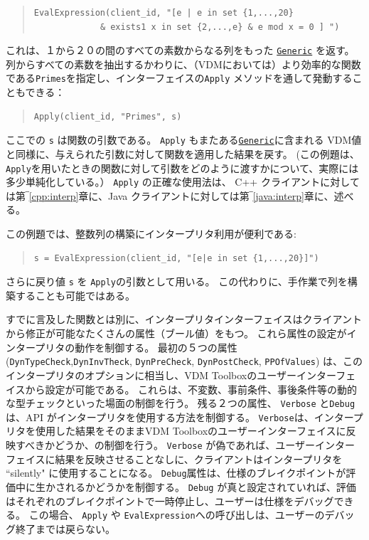 \documentclass[\pformat,12pt]{jarticle}
\newcommand{\Generic}{\hyperlink{interface.Generic}{Generic}}
\begin{document}
\newpage
\begin{quote}
\begin{verbatim}    
EvalExpression(client_id, "[e | e in set {1,...,20} 
             & exists1 x in set {2,...,e} & e mod x = 0 ] ")
\end{verbatim}
\end{quote}

これは、１から２０の間のすべての素数からなる列をもった {\tt \Generic} を返す。列からすべての素数を抽出するかわりに、（VDMにおいては）より効率的な関数である{\tt Primes}を指定し、インターフェイスの{\tt Apply} メソッドを通して発動することもできる：

\begin{quote}
\begin{verbatim}    
Apply(client_id, "Primes", s)
\end{verbatim}
\end{quote}

ここでの {\tt s} は関数の引数である。
{\tt Apply} もまたある{\tt \Generic}に含まれる VDM値と同様に、与えられた引数に対して関数を適用した結果を戻す。
(この例題は、{\tt Apply}を用いたときの関数に対して引数をどのように渡すかについて、実際には多少単純化している。）
 {\tt Apply} の正確な使用法は、 C++ クライアントに対しては第‾\ref{cpp:interp}章に、Java クライアントに対しては第‾\ref{java:interp}章に、述べる。

この例題では、整数列の構築にインタープリタ利用が便利である:

\begin{quote}
\begin{verbatim}    
s = EvalExpression(client_id, "[e|e in set {1,...,20}]")
\end{verbatim}
\end{quote}

さらに戻り値 {\tt s} を {\tt  Apply}の引数として用いる。 
この代わりに、手作業で列を構築することも可能ではある。

すでに言及した関数とは別に、インタープリタインターフェイスはクライアントから修正が可能なたくさんの属性（ブール値）をもつ。
これら属性の設定がインタープリタの動作を制御する。
最初の５つの属性 ({\tt DynTypeCheck},{\tt DynInvTheck}, {\tt DynPreCheck}, {\tt DynPostCheck}, {\tt  PPOfValues}) は、このインタープリタのオプションに相当し、VDM Toolboxのユーザーインターフェイスから設定が可能である。
これらは、不変数、事前条件、事後条件等の動的な型チェックといった場面の制御を行う。
残る２つの属性、 {\tt Verbose} と{\tt Debug}は、API がインタープリタを使用する方法を制御する。
{\tt Verbose}は、インタープリタを使用した結果をそのままVDM Toolboxのユーザーインターフェイスに反映すべきかどうか、の制御を行う。
 {\tt Verbose} が偽であれば、ユーザーインターフェイスに結果を反映させることなしに、クライアントはインタープリタを ``silently" に使用することになる。
 {\tt Debug}属性は、仕様のブレイクポイントが評価中に生かされるかどうかを制御する。
 {\tt Debug} が真と設定されていれば、評価はそれぞれのブレイクポイントで一時停止し、ユーザーは仕様をデバッグできる。
この場合、 {\tt Apply} や {\tt  EvalExpression}への呼び出しは、ユーザーのデバッグ終了までは戻らない。
\end{document}
